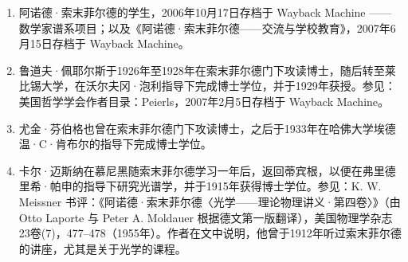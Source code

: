 \begin{enumerate}
\begin{itemize}
\item 博士与教授资格：卡尔·贝歇特、汉斯·贝特、彼得·德拜、保罗·彼得·埃瓦尔德、阿道夫·克拉策尔、威廉·伦茨、路德维希·瓦尔德曼、海因里希·韦尔克以及格雷戈尔·文策尔。
\item 教授资格：瓦尔特·科塞尔、马克斯·冯·劳厄以及沃伊切赫·鲁比诺维奇。
\item 博士后：威廉·阿利斯、博伊德·巴特利特、理查德·贝克尔、爱德华·康登、卡尔·埃卡特、威廉·V·休斯顿、埃德温·C·肯布尔、菲利普·M·莫尔斯、卡雷尔·尼森、莱纳斯·鲍林、伊西多·拉比、霍华德·罗伯逊以及弗里茨·绍特。
\item 亚琛本科生：瓦尔特·罗戈夫斯基。
\end{itemize}
\item 阿诺德·索末菲尔德的学生，2006年10月17日存档于 Wayback Machine —— 数学家谱系项目；以及《阿诺德·索末菲尔德——交流与学校教育》，2007年6月15日存档于 Wayback Machine。
\item 鲁道夫·佩耶尔斯于1926年至1928年在索末菲尔德门下攻读博士，随后转至莱比锡大学，在沃尔夫冈·泡利指导下完成博士学位，并于1929年获授。参见：美国哲学学会作者目录：Peierls，2007年2月5日存档于 Wayback Machine。
\item 尤金·芬伯格也曾在索末菲尔德门下攻读博士，之后于1933年在哈佛大学埃德温·C·肯布尔的指导下完成博士学位。
\item 卡尔·迈斯纳在慕尼黑随索末菲尔德学习一年后，返回蒂宾根，以便在弗里德里希·帕申的指导下研究光谱学，并于1915年获得博士学位。参见：K. W. Meissner 书评：《阿诺德·索末菲尔德〈光学——理论物理讲义·第四卷〉》（由 Otto Laporte 与 Peter A. Moldauer 根据德文第一版翻译），美国物理学杂志23卷(7)，477–478（1955年）。作者在文中说明，他曾于1912年听过索末菲尔德的讲座，尤其是关于光学的课程。

\end{enumerate}